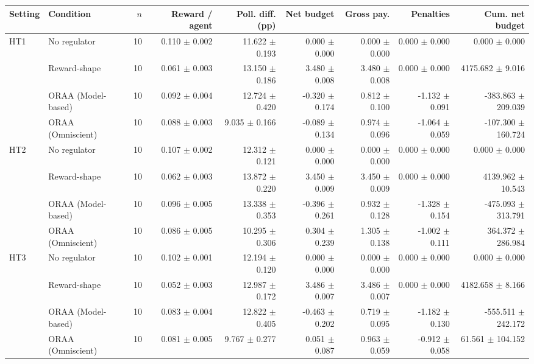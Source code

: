 \begin{tabular}{llrrrrrrr}
\toprule
Setting & Condition & $n$ & Reward / agent & Poll. diff. (pp) & Net budget & Gross pay. & Penalties & Cum. net budget \\
\midrule
HT1 & No regulator & 10 & 0.110 $\pm$ 0.002 & 11.622 $\pm$ 0.193 & 0.000 $\pm$ 0.000 & 0.000 $\pm$ 0.000 & 0.000 $\pm$ 0.000 & 0.000 $\pm$ 0.000 \\
 & Reward-shape & 10 & 0.061 $\pm$ 0.003 & 13.150 $\pm$ 0.186 & 3.480 $\pm$ 0.008 & 3.480 $\pm$ 0.008 & 0.000 $\pm$ 0.000 & 4175.682 $\pm$ 9.016 \\
 & ORAA (Model-based) & 10 & 0.092 $\pm$ 0.004 & 12.724 $\pm$ 0.420 & -0.320 $\pm$ 0.174 & 0.812 $\pm$ 0.100 & -1.132 $\pm$ 0.091 & -383.863 $\pm$ 209.039 \\
 & ORAA (Omniscient) & 10 & 0.088 $\pm$ 0.003 & 9.035 $\pm$ 0.166 & -0.089 $\pm$ 0.134 & 0.974 $\pm$ 0.096 & -1.064 $\pm$ 0.059 & -107.300 $\pm$ 160.724 \\
\addlinespace
HT2 & No regulator & 10 & 0.107 $\pm$ 0.002 & 12.312 $\pm$ 0.121 & 0.000 $\pm$ 0.000 & 0.000 $\pm$ 0.000 & 0.000 $\pm$ 0.000 & 0.000 $\pm$ 0.000 \\
 & Reward-shape & 10 & 0.062 $\pm$ 0.003 & 13.872 $\pm$ 0.220 & 3.450 $\pm$ 0.009 & 3.450 $\pm$ 0.009 & 0.000 $\pm$ 0.000 & 4139.962 $\pm$ 10.543 \\
 & ORAA (Model-based) & 10 & 0.096 $\pm$ 0.005 & 13.338 $\pm$ 0.353 & -0.396 $\pm$ 0.261 & 0.932 $\pm$ 0.128 & -1.328 $\pm$ 0.154 & -475.093 $\pm$ 313.791 \\
 & ORAA (Omniscient) & 10 & 0.086 $\pm$ 0.005 & 10.295 $\pm$ 0.306 & 0.304 $\pm$ 0.239 & 1.305 $\pm$ 0.138 & -1.002 $\pm$ 0.111 & 364.372 $\pm$ 286.984 \\
\addlinespace
HT3 & No regulator & 10 & 0.102 $\pm$ 0.001 & 12.194 $\pm$ 0.120 & 0.000 $\pm$ 0.000 & 0.000 $\pm$ 0.000 & 0.000 $\pm$ 0.000 & 0.000 $\pm$ 0.000 \\
 & Reward-shape & 10 & 0.052 $\pm$ 0.003 & 12.987 $\pm$ 0.172 & 3.486 $\pm$ 0.007 & 3.486 $\pm$ 0.007 & 0.000 $\pm$ 0.000 & 4182.658 $\pm$ 8.166 \\
 & ORAA (Model-based) & 10 & 0.083 $\pm$ 0.004 & 12.822 $\pm$ 0.405 & -0.463 $\pm$ 0.202 & 0.719 $\pm$ 0.095 & -1.182 $\pm$ 0.130 & -555.511 $\pm$ 242.172 \\
 & ORAA (Omniscient) & 10 & 0.081 $\pm$ 0.005 & 9.767 $\pm$ 0.277 & 0.051 $\pm$ 0.087 & 0.963 $\pm$ 0.059 & -0.912 $\pm$ 0.058 & 61.561 $\pm$ 104.152 \\

\end{tabular}
